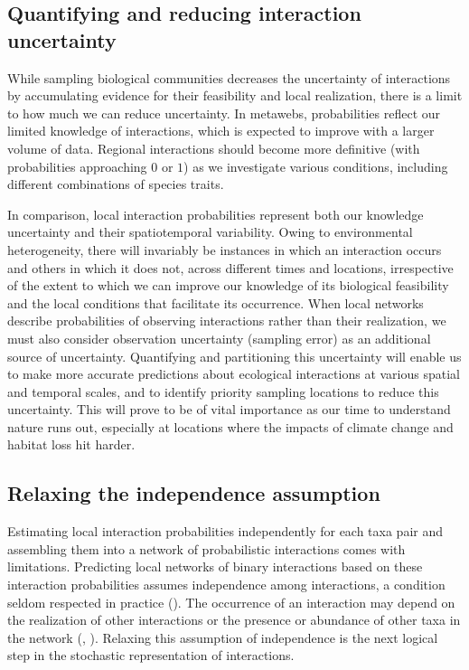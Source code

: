 \subsection{Quantifying and reducing interaction uncertainty} 

While sampling biological communities decreases the uncertainty of interactions
by accumulating evidence for their feasibility and local realization, there is a
limit to how much we can reduce uncertainty. In metawebs, probabilities reflect
our limited knowledge of interactions, which is expected to improve with a
larger volume of data. Regional interactions should become more definitive (with
probabilities approaching $0$ or $1$) as we investigate various conditions,
including different combinations of species traits. 

In comparison, local interaction probabilities represent both our knowledge
uncertainty and their spatiotemporal variability. Owing to environmental
heterogeneity, there will invariably be instances in which an interaction occurs
and others in which it does not, across different times and locations,
irrespective of the extent to which we can improve our knowledge of its
biological feasibility and the local conditions that facilitate its occurrence.
When local networks describe probabilities of observing interactions rather than
their realization, we must also consider observation uncertainty (sampling
error) as an additional source of uncertainty. Quantifying and partitioning this
uncertainty will enable us to make more accurate predictions about ecological
interactions at various spatial and temporal scales, and to identify priority
sampling locations to reduce this uncertainty. This will prove to be of vital
importance as our time to understand nature runs out, especially at locations
where the impacts of climate change and habitat loss hit harder.

\subsection{Relaxing the independence assumption} 

Estimating local interaction probabilities independently for each taxa pair and
assembling them into a network of probabilistic interactions comes with
limitations. Predicting local networks of binary interactions based on these
interaction probabilities assumes independence among interactions, a condition
seldom respected in practice (\cite{Golubski2011Modifying}). The occurrence of
an interaction may depend on the realization of other interactions or the
presence or abundance of other taxa in the network
(\cite{Pilosof2017Multilayer}, \cite{Kefi2012More}). Relaxing this assumption of
independence is the next logical step in the stochastic representation of
interactions. 


